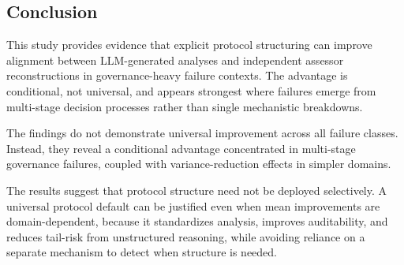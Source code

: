 \subsection{Conclusion}

This study provides evidence that explicit protocol structuring can improve alignment between LLM-generated analyses and independent assessor reconstructions in governance-heavy failure contexts. The advantage is conditional, not universal, and appears strongest where failures emerge from multi-stage decision processes rather than single mechanistic breakdowns.

The findings do not demonstrate universal improvement across all failure classes. Instead, they reveal a conditional advantage concentrated in multi-stage governance failures, coupled with variance-reduction effects in simpler domains.

The results suggest that protocol structure need not be deployed selectively. A universal protocol default can be justified even when mean improvements are domain-dependent, because it standardizes analysis, improves auditability, and reduces tail-risk from unstructured reasoning, while avoiding reliance on a separate mechanism to detect when structure is needed.
\newpage
\appendix
